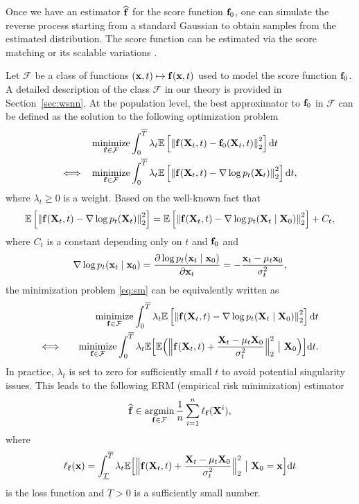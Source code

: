 \documentclass[twoside,11pt]{article}
\def\cF{\mathcal F}
\newcommand{\bff}{{\bf f}}
\newcommand{\bx}{{\bf x}}
\newcommand{\bX}{{\bf X}}
\newcommand{\bbE}{{\mathbb E}}
\newcommand{\be}{\begin{equation}}
\newcommand{\ee}{\end{equation}}
\newcommand{\bean}{\setlength\arraycolsep{1pt}\begin{eqnarray*}}
\newcommand{\eean}{\end{eqnarray*}}
\DeclareMathOperator*{\argmin}{argmin}
\DeclareMathOperator*{\minimize}{minimize}
\def\d{{\rm d}}
\begin{document}
Once we have an estimator $\widehat \bff$ for the score function $\bff_0$, one can simulate the reverse process starting from a standard Gaussian to obtain samples from the estimated distribution.
The score function can be estimated via the score matching \citep{hyvarinen2005estimation} or its scalable variations \citep{vincent2011connection, song2020sliced, yu2022generalized}.

Let $\cF$ be a class of functions $(\bx, t) \mapsto \bff(\bx, t)$ used to model the score function $\bff_0$.
A detailed description of the class $\cF$ in our theory is provided in Section~\ref{sec:wsnn}.
At the population level, the best approximator to $\bff_0$ in $\cF$ can be defined as the solution to the following optimization problem
\be\begin{split} \label{eq:sm}
 &\minimize_{\bff \in \cF} \int_{0}^{\overline{T}}  \lambda_t \bbE \left[ \left\| \bff(\bX_{t}, t) - \bff_0(\bX_t, t) \right\|_2^2 \right] \d t
 \\
 \Longleftrightarrow \quad & \minimize_{\bff \in \cF} \int_{0}^{\overline{T}}  \lambda_t \bbE \left[ \left\| \bff(\bX_{t}, t) - \nabla \log p_t(\bX_{t}) \right\|_2^2 \right] \d t,
\end{split}\ee
where $\lambda_t \geq 0$ is a weight.
Based on the well-known fact \citep{vincent2011connection} that
\be
\bbE \left[ \left\| \bff(\bX_{t}, t) - \nabla \log p_t(\bX_{t}) \right\|_2^2 \right]
= \bbE \left[ \left\| \bff(\bX_{t}, t) - \nabla \log p_t(\bX_{t} \mid \bX_{0}) \right\|_2^2 \right] + C_{t}, \label{eq:smvincent}
\ee
where $C_{t}$ is a constant depending only on $t$ and $\bff_0$ and 
\bean
 \nabla \log p_t(\bx_t \mid \bx_0) = \frac{\partial \log p_t(\bx_t \mid \bx_0)}{\partial \bx_t}
 = -\frac{\bx_{t} - \mu_t \bx_{0}}{\sigma_t^2},
\eean
the minimization problem \eqref{eq:sm} can be equivalently written as
\bean
 && \minimize_{\bff \in \cF} \int_{0}^{\overline{T}}  \lambda_t \bbE \left[ \left\| \bff(\bX_{t}, t) - \nabla \log p_t(\bX_{t} \mid \bX_{0}) \right\|_2^2 \right] \d t
 \\
 \Longleftrightarrow \quad && \minimize_{\bff \in \cF} \int_{0}^{\overline{T}}  \lambda_t \bbE \Big[ \bbE \Big( \Big\| \bff(\bX_{t}, t) + \frac{\bX_t - \mu_t \bX_0}{\sigma_t^2} \Big\|_2^2 ~ \big| ~ \bX_0 \Big) \Big] \d t.
\eean
In practice, $\lambda_t$ is set to zero for sufficiently small $t$ to avoid potential singularity issues.
This leads to the following ERM (empirical risk minimization) estimator
\be
\widehat \bff \in \argmin_{\bff \in \cF}
\frac{1}{n} \sum_{i=1}^n \ell_{\bff}(\bX^{i}),
\label{eqthm2:erm}
\ee
where
\be
\ell_{\bff}(\bx) = \int_{\underline{T}}^{\overline{T}}   \lambda_t \bbE \Big[ \Big\| \bff(\bX_{t}, t) + \frac{\bX_t - \mu_t \bX_0}{\sigma_t^2} \Big\|_2^2 ~ \big| ~ \bX_0 = \bx \Big]\d t
\label{eq:loss}
\ee
is the loss function and $\underline{T} > 0$ is a sufficiently small number.
\end{document}
